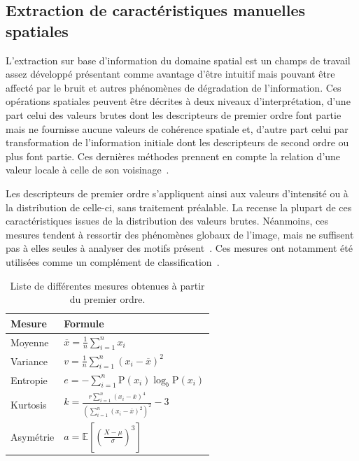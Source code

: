 \subsection{Extraction de caractéristiques manuelles spatiales}
L'extraction sur base d'information du domaine spatial est un champs de travail assez développé présentant comme avantage d'être intuitif mais pouvant être affecté par le bruit et autres phénomènes de dégradation de l'information. Ces opérations spatiales peuvent être décrites à deux niveaux d'interprétation, d'une part celui des valeurs brutes dont les descripteurs de premier ordre font partie mais ne fournisse aucune valeurs de cohérence spatiale et, d'autre part celui par transformation de l'information initiale dont les descripteurs de second ordre ou plus font partie. Ces dernières méthodes prennent en compte la relation d'une valeur locale à celle de son voisinage~\cite{Kamila2015}.\par

Les descripteurs de premier ordre s'appliquent ainsi aux valeurs d'intensité ou à la distribution de celle-ci, sans traitement préalable. La  recense la plupart de ces caractéristiques issues de la distribution des valeurs brutes. Néanmoins, ces mesures tendent à ressortir des phénomènes globaux de l'image, mais ne suffisent pas à elles seules à analyser des motifs présent~\cite{Tomita1990, Srinivasan2008, Uyun2013, NyeinNyeinHlaing2015}. Ces mesures ont notamment été utilisées comme un complément de classification~\cite{Wiltgen2008}.\par

\begin{table}[H]
    \centering
    \begin{tabular}{ll}
        \toprule
        \textbf{Mesure}             & \textbf{Formule}                                                  \\ \hline
        Moyenne                     & $\overline{x} = \frac{1}{n}\sum_{i=1}^n x_i$                      \\   
        Variance                    & $v = \frac{1}{n}\sum_{i=1}^n \left(x_i - \overline{x}\right)^2$   \\ 
        Entropie                    & $e = -\sum_{i=1}^n {\mathrm{P}(x_i) \log_b \mathrm{P}(x_i)}$\\
        Kurtosis                    & $k=\frac{r \sum_{i=1}^{n}\left(x_{i}-\bar{x}\right)^{4}}{\left(\sum_{i=1}^{n}\left(x_{i}-\bar{x}\right)^{2}\right)^{2}}-3$\\
        Asymétrie                   & $a = \mathbb{E} \left[ \left( \frac{X - \mu}{\sigma} \right)^3 \right]$\\  
        \bottomrule
    \end{tabular}
    \caption{Liste de différentes mesures obtenues à partir du premier ordre.}
    \label{tab:first_order_descriptors}
\end{table}\par

